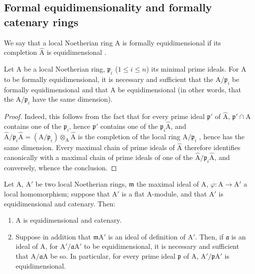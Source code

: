 \subsection{Formal equidimensionality and formally catenary rings}
\label{subsection:IV.7.1}


\begin{definition}[7.1.1]
\label{IV.7.1.1}
We say that a local Noetherian ring $\mathrm{A}$ is formally equidimensional if its completion $\widehat{\mathrm{A}}$ is equidimensional .
\end{definition}

\begin{proposition}[7.1.2]
\label{IV.7.1.2}
Let $\mathrm{A}$ be a local Noetherian ring, $\mathfrak{p}_i$ \textup{(}$1\leqslant i\leqslant n$\textup{)} its minimal prime ideals.
For $\mathrm{A}$ to be formally equidimensional, it is necessary and sufficient that the $\mathrm{A}/\mathfrak{p}_i$ be formally equidimensional and that $\mathrm{A}$ be equidimensional \textup{(in other words, that the $\mathrm{A}/\mathfrak{p}_i$ have the same dimension)}.
\end{proposition}

\begin{proof}
Indeed, this follows from the fact that for every prime ideal $\mathfrak{p}'$ of $\widehat{\mathrm{A}}$, $\mathfrak{p}'\cap\mathrm{A}$ contains one of the $\mathfrak{p}_i$, hence $\mathfrak{p}'$ contains one of the $\mathfrak{p}_i\widehat{\mathrm{A}}$, and $\widehat{\mathrm{A}}/\mathfrak{p}_i\widehat{\mathrm{A}}=(\mathrm{A}/\mathfrak{p}_i)\otimes_\mathrm{A}\widehat{\mathrm{A}}$ is the completion of the local ring $\mathrm{A}/\mathfrak{p}_i$ , hence has the same dimension.
Every maximal chain of prime ideals of $\widehat{\mathrm{A}}$ therefore identifies canonically with a maximal chain of prime ideals of one of the $\widehat{\mathrm{A}}/\mathfrak{p}_i\widehat{\mathrm{A}}$, and conversely, whence the conclusion.
\end{proof}

\begin{proposition}[7.1.3]
\label{IV.7.1.3}
Let $\mathrm{A}$, $\mathrm{A}'$ be two local Noetherian rings, $\mathfrak{m}$ the maximal ideal of $\mathrm{A}$, $\varphi:\mathrm{A}\to\mathrm{A}'$ a local homomorphism; suppose that $\mathrm{A}'$ is a flat $\mathrm{A}$-module, and that $\mathrm{A}'$ is equidimensional and catenary.
Then:
\begin{enumerate}[label=\emph{\roman*)}]
  \item $\mathrm{A}$ is equidimensional and catenary.
  \item Suppose in addition that $\mathfrak{m}\mathrm{A}'$ is an ideal of definition of $\mathrm{A}'$.
  Then, if $\mathfrak{a}$ is an ideal of $\mathrm{A}$, for $\mathrm{A}'/\mathfrak{a}\mathrm{A}'$ to be equidimensional, it is necessary and sufficient that $\mathrm{A}/\mathfrak{a}\mathrm{A}$ be so.
  In particular, for every prime ideal $\mathfrak{p}$ of $\mathrm{A}$, $\mathrm{A}'/\mathfrak{p}\mathrm{A}'$ is equidimensional.
\end{enumerate}
\end{proposition}

